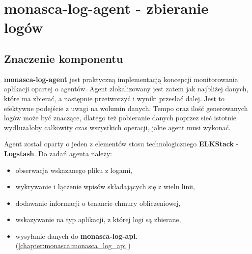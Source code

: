 \section{monasca-log-agent - zbieranie logów}
\label{chapter:monasca:monasca_log_agent}

    \subsection{Znaczenie komponentu}
    \textbf{monasca-log-agent} jest praktyczną implementacją koncepcji monitorowania aplikacji opartej o agentów.
    Agent zlokalizowany jest zatem jak najbliżej danych, które ma zbierać, a następnie przetworzyć i wyniki
    przesłać dalej. Jest to efektywne podejście z uwagi na wolumin danych. Tempo oraz ilość generowanych logów
    może być znaczące, dlatego też pobieranie danych poprzez sieć istotnie wydłużałoby całkowity czas 
    wszystkich operacji, jakie agent musi wykonać.
    
    Agent został oparty o jeden z elementów stosu technologicznego \textbf{ELKStack} - \textbf{Logstash}.
    Do zadań agenta należy:
    \begin{itemize}
        \item obserwacja wskazanego pliku z logami,
        \item wykrywanie i łączenie wpisów składających się z wielu linii,
        \item dodawanie informacji o tenancie chmury obliczeniowej,
        \item wskazywanie na typ aplikacji, z której logi są zbierane,
        \item wysyłanie danych do \textbf{monasca-log-api}. (\ref{chapter:monasca:monasca_log_api})
    \end{itemize}
    
